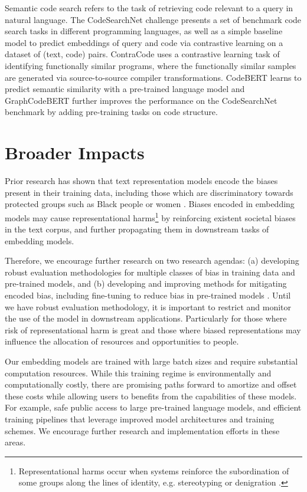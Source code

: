 \documentclass[nohyperref]{article}
\begin{document}
Semantic code search refers to the task of retrieving code relevant to a query in natural language. The CodeSearchNet challenge \cite{codesearchnet} presents a set of benchmark code search tasks in different programming languages, as well as a simple baseline model to predict embeddings of query and code via contrastive learning on a dataset of (text, code) pairs. ContraCode  \cite{Jain} uses a contrastive learning task of identifying functionally similar programs, where the functionally similar samples are generated via source-to-source compiler transformations. CodeBERT \cite{codebert} learns to predict semantic similarity with a pre-trained language model and GraphCodeBERT \cite{Guo} further improves the performance on the CodeSearchNet benchmark by adding pre-training tasks on code structure. 

\section{Broader Impacts}
Prior research has shown that text representation models encode the biases present in their training data, including those which are discriminatory towards protected groups such as Black people or women \cite{Bolukbasi,Caliskan, May,Zhao,Rudinger}. Biases encoded in embedding models may cause representational harms\footnote{ Representational harms occur when systems reinforce the subordination of some groups along the lines of identity, e.g. stereotyping or denigration \cite{Crawford}.} by reinforcing existent societal biases in the text corpus, and further propagating them in downstream tasks of embedding models. 

Therefore, we encourage further research on two research agendas: (a) developing robust evaluation methodologies for multiple classes of bias in training data and pre-trained models, and (b) developing and improving methods for mitigating encoded bias, including fine-tuning to reduce bias in pre-trained models \cite{Caliskan,May,Bolukbasi,Liang,parkbias, Solaiman}. Until we have robust evaluation methodology, it is important to restrict and monitor the use of the model in downstream applications. Particularly for those where risk of representational harm is great and those where biased representations may influence the allocation of resources and opportunities to people.

Our embedding models are trained with large batch sizes and require substantial computation resources. While this training regime is environmentally and computationally costly, there are promising paths forward to amortize and offset these costs while allowing users to benefits from the capabilities of these models. For example, safe public access to large pre-trained language models, and efficient training pipelines that leverage improved model architectures and training schemes. We encourage further research and implementation efforts in these areas.
\end{document}
